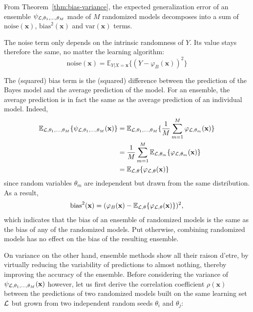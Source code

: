 From Theorem~\ref{thm:bias-variance}, the expected generalization error of an
ensemble $\psi_{{\cal L},\theta_1,\dots,\theta_M}$ made of $M$ randomized
models decomposes into a sum of $\text{noise}(\mathbf{x})$,
$\text{bias}^2(\mathbf{x})$ and $\text{var}(\mathbf{x})$ terms.

The noise term only depends on the intrinsic randomness of $Y$. Its value
stays therefore the same, no matter the learning algorithm:
\begin{equation}
\text{noise}(\mathbf{x}) = \mathbb{E}_{Y|X=\mathbf{x}} \{ (Y - \varphi_B(\mathbf{x}))^2 \}
\end{equation}

The (squared) bias term is the (squared) difference between the prediction of the Bayes model
and the average prediction of the model. For an ensemble, the average prediction
is in fact the same as the average prediction of an individual model. Indeed,
\begin{align}
\mathbb{E}_{{\cal L},\theta_1,\dots,\theta_M} \{ \psi_{{\cal L},\theta_1,\dots,\theta_M}(\mathbf{x}) \} &= \mathbb{E}_{{\cal L},\theta_1,\dots,\theta_M} \{ \frac{1}{M} \sum_{m=1}^M \varphi_{{\cal L},\theta_m}(\mathbf{x}) \} \nonumber \\
&= \frac{1}{M} \sum_{m=1}^M \mathbb{E}_{{\cal L},\theta_m} \{ \varphi_{{\cal L},\theta_m}(\mathbf{x}) \} \nonumber \\
&= \mathbb{E}_{{\cal L},\theta} \{ \varphi_{{\cal L},\theta}(\mathbf{x}) \}
\end{align}
since random variables $\theta_m$ are independent but drawn from the
same distribution. As a result,
\begin{equation}
\text{bias}^2(\mathbf{x}) = (\varphi_B(\mathbf{x}) - \mathbb{E}_{{\cal L},\theta} \{ \varphi_{{\cal L},\theta}(\mathbf{x}) \})^2,
\end{equation}
which indicates that the bias of an ensemble of randomized models is the same
as the bias of any of the randomized models. Put otherwise, combining
randomized models has no effect on the bias of the resulting ensemble.

On variance on the other hand, ensemble methods show all their raison d'etre,
by virtually reducing the variability of predictions to almost nothing, thereby
improving the accuracy of the ensemble. Before considering the variance of
$\psi_{{\cal L},\theta_1,\dots,\theta_M}(\mathbf{x})$ however, let us first derive the
correlation coefficient $\rho(\mathbf{x})$ between the predictions of two
randomized models built on the same learning set ${\cal L}$ but grown from two
independent random seeds $\theta_i$ and $\theta_j$:

